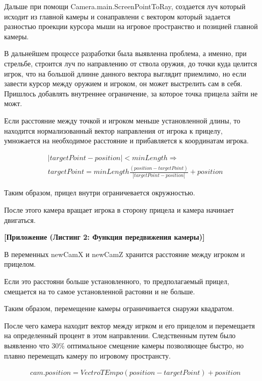 \documentclass[14pt, titlepage,fleqn,a4paper]{extarticle}
\begin{document}
    Дальше при помощи Camera.main.ScreenPointToRay, создается луч который исходит из главной камеры и сонаправлени с вектором который задается разностью проекции курсора мыши на игровое пространство и позицией главной камеры.
    
    В дальнейшем процессе разработки была выявленна проблема, а именно, при стрельбе, строится луч по направлению от ствола оружия, до точки куда целится игрок, что на большой длинне данного вектора выглядит приемлимо, но если завести курсор между оружием и игроком, он может выстрелить сам в себя. Пришлось добавлять внутреннее ограничение, за которое точка прицела зайти не можт.
    
    Если расстояние между точкой и игроком меньше установленной длины, то находится нормализованный вектор направления от игрока к прицелу, умножается на необходимое расстояние и прибавляется к координатам игрока. 
    
    \begin{align*}
        & |targetPoint - position|< minLength \Rightarrow\\
        & targetPoint = minLength\frac{(position - targetPoint)}{|targetPoint - position|} + position
    \end{align*}
    
    Таким образом, прицел внутри ограничевается окружностью.
    
    После этого камера вращает игрока в сторону прицела и камера начинает двигаться.
    
    \textbf{[Приложение (Листинг 2: Функция передвижения камеры)]}
    
    В переменных newCamX и newCamZ хранится расстояние между игроком и прицелом. 
    
    Если это расстояни больше установленного, то предполагаемый прицел, смещается на то самое установленной растояни и не больше.
    
    Таким образом, перемещение камеры ограничивается снаружи квадратом.
    
    После чего камера находит вектор между игрком и его прицелом и перемещаетя на определенный процент в этом направлении. Следственным путем было выявленно что 30\% оптимальное смещение камеры позволяющее быстро, но плавно перемещать камеру по игровому пространсту.
    
    \begin{align*}
        & cam.position = VectroTEmpo(position - targetPoint) + position
    \end{align*}
    
\end{document}
